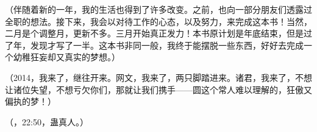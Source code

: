 \begin{this_body}
（伴随着新的一年，我的生活也得到了许多改变。之前，也向一部分朋友们透露过全职的想法。接下来，我会以对待工作的心态，以及努力，来完成这本书！当然，二月是个调整月，更新不多。三月开始真正发力！本书原计划是年底结束，但是过了年，发现才写了一半。这本书非同一般，我终于能摆脱一些东西，好好去完成一个幼稚狂妄却又真实的梦想。）

（2014，我来了，继往开来。网文，我来了，两只脚踏进来。诸君，我来了，不想让诸位失望，不想亏欠你们，那就让我们携手——圆这个常人难以理解的，狂傲又偏执的梦！）

（，22:50，蛊真人。）

\end{this_body}

